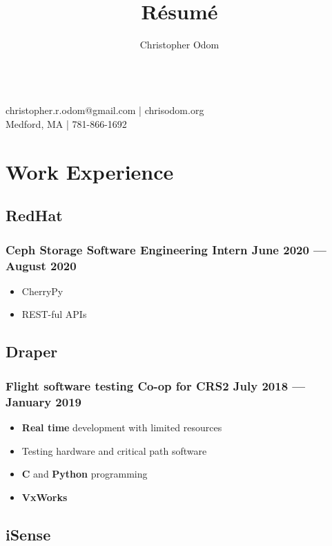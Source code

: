 \documentclass[11pt]{article}
\makeatletter
\renewcommand{\maketitle}
{
	\Huge \noindent \theauthor \\
	\large\noindent christopher.r.odom@gmail.com | chrisodom.org \\
	Medford, MA | 781-866-1692
}
\makeatother
\begin{document}
\setlength\multicolsep{0pt}



\title{R\'esum\'e}
\author{Christopher Odom}

\maketitle

\section{Work Experience}

\subsection{\bfseries RedHat}
\subsubsection{Ceph Storage Software Engineering Intern\hspace*{\fill} June 2020 --- August 2020}
\begin{itemize}[noitemsep, topsep=0pt]
	\item[] CherryPy
	\item[] REST-ful APIs
\end{itemize}
\noindent

\subsection{\bfseries Draper}
\subsubsection{Flight software testing Co-op for CRS2\hspace*{\fill} July 2018 --- January 2019}
\begin{itemize}[noitemsep, topsep=0pt]
	\item[] {\bf Real time} development with limited resources
	\item[] Testing hardware and critical path software
	\item[] {\bf C} and {\bf Python} programming
	\item[] {\bf VxWorks}
\end{itemize}

\subsection{\bfseries iSense}
\end{document}
